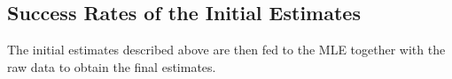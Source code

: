 


\subsection{Success Rates of the Initial Estimates}

The initial estimates described above are then fed to the MLE together with the raw data to obtain the final estimates.

